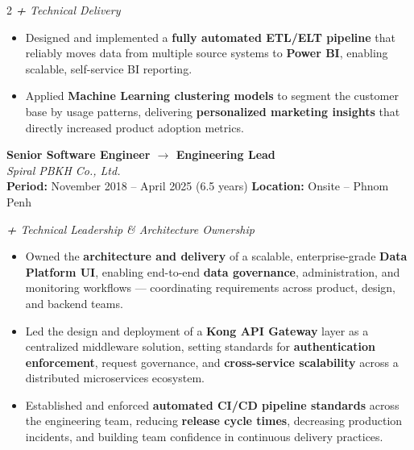 \documentclass[11pt,a4paper]{article}
\newcommand{\jobentry}[4]{%
  {\textbf{#1}}\\
  {\itshape #2}\\[2pt]
  {\small \textbf{Period:} #3 \hfill \textbf{Location:} #4}
}
\begin{document}
\begin{paracol}{2}
  \vspace{2pt}
  {\small\textit{\textcolor{accentblue}{\textbf{+} Technical Delivery}}}
  \begin{itemize}[leftmargin=1.2em, itemsep=2pt, topsep=2pt]
    \item Designed and implemented a \textbf{fully automated ETL/ELT pipeline} that reliably moves data from multiple source systems to \textbf{Power BI}, enabling scalable, self-service BI reporting.
    \item Applied \textbf{Machine Learning clustering models} to segment the customer base by usage patterns, delivering \textbf{personalized marketing insights} that directly increased product adoption metrics.
  \end{itemize}

  \vspace{8pt}

  \jobentry{Senior Software Engineer $\rightarrow$ Engineering Lead}{Spiral PBKH Co., Ltd.}{November 2018 -- April 2025 \normalfont\small(6.5 years)}{Onsite -- Phnom Penh}

  \vspace{5pt}
  {\small\textit{\textcolor{accentblue}{\textbf{+} Technical Leadership \& Architecture Ownership}}}
  \begin{itemize}[leftmargin=1.2em, itemsep=2pt, topsep=2pt]
    \item Owned the \textbf{architecture and delivery} of a scalable, enterprise-grade \textbf{Data Platform UI}, enabling end-to-end \textbf{data governance}, administration, and monitoring workflows --- coordinating requirements across product, design, and backend teams.
    \item Led the design and deployment of a \textbf{Kong API Gateway} layer as a centralized middleware solution, setting standards for \textbf{authentication enforcement}, request governance, and \textbf{cross-service scalability} across a distributed microservices ecosystem.
    \item Established and enforced \textbf{automated CI/CD pipeline standards} across the engineering team, reducing \textbf{release cycle times}, decreasing production incidents, and building team confidence in continuous delivery practices.
  \end{itemize}


\end{paracol}
\end{document}
